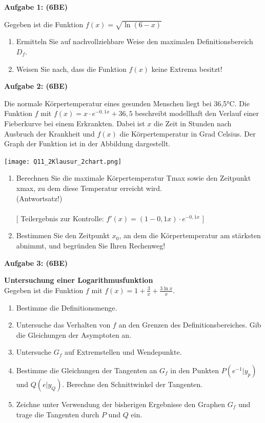 \documentclass[a4paper,12pt]{article}
\newcommand{\Aufgabe}[1]{
  {
  \vspace*{0.5cm}
  \textsf{\textbf{Aufgabe #1}}
  \vspace*{0.2cm}
  
  }
}
\begin{document}
\vspace{5cm}

\newpage


\Aufgabe{1: (6BE)}

Gegeben ist die Funktion $f\left(x\right)=\sqrt{\ln (6-x)}$

\begin{enumerate}[label={\alph*)}]
\item Ermitteln Sie auf nachvollziehbare Weise den maximalen Definitionsbereich $D_f$.
\item Weisen Sie nach, dass die Funktion $f(x)$ keine Extrema besitzt!
\end{enumerate}

\vspace{2cm}


\Aufgabe{2: (6BE)}
Die normale Körpertemperatur eines gesunden Menschen liegt bei 36,5°C.  Die Funktion $f$ mit $f(x) = x \cdot e^{-0,1x} + 36,5$ beschreibt modellhaft den Verlauf einer Fieberkurve bei einem Erkrankten.  Dabei ist $x$ die Zeit in Stunden nach Ausbruch der Krankheit und $f(x)$ die Körpertemperatur in Grad Celsius. Der Graph der Funktion ist in der Abbildung dargestellt.

\begin{center}
\texttt{[image: Q11\_2Klausur\_2chart.png]}
\end{center}

\begin{enumerate}[label={\alph*)}]
  \item Berechnen Sie die maximale Körpertemperatur Tmax sowie den Zeitpunkt xmax, zu dem diese Temperatur erreicht wird.\\
(Antwortsatz!)\\
\\
    {[ Teilergebnis zur Kontrolle: $f'(x) = (1-0,1x) \cdot e^{-0,1x}$ ]}
  \item Bestimmen Sie den Zeitpunkt $x_0$, an dem die Körpertemperatur am stärksten abnimmt, und begründen Sie Ihren Rechenweg!
\end{enumerate}


\Aufgabe{3: (6BE)} \textbf{Untersuchung einer Logarithmusfunktion}\\

Gegeben ist die Funktion $f$ mit $f(x)=1+\frac{3}{x}+\frac{3 \ln x}{x}$.

\begin{enumerate}[label={\alph*)}]
  \item Bestimme die Definitionsmenge.
  \item Untersuche das Verhalten von $f$ an den Grenzen des Definitionsbereiches. Gib die Gleichungen der Asymptoten an.
  \item Untersuche $G_f$ auf Extremstellen und Wendepunkte.
  \item Bestimme die Gleichungen der Tangenten an $G_f$ in den Punkten $P(e^{-1} | y_p)$ und $Q(e|y_Q)$. Berechne den Schnittwinkel der Tangenten. 
  \item Zeichne unter Verwendung der bisherigen Ergebnisse den Graphen $G_f$ und trage die Tangenten durch $P$ und $Q$ ein.
\end{enumerate}
\end{document}
